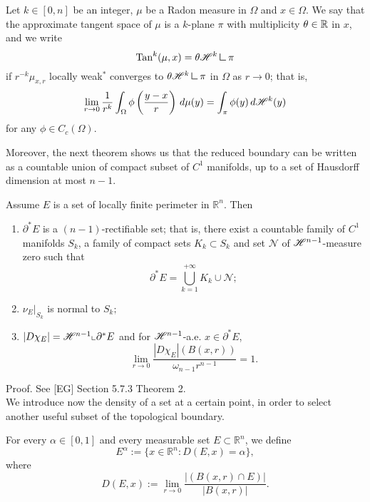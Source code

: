 \begin{definition}
Let $k \in [0, n]$ be an integer, $\mu$ be a Radon measure in $\Omega$ and $x \in \Omega$. We say that the approximate tangent space of $\mu$ is a $k$-plane $\pi$ with multiplicity $\theta \in \mathbb{R}$ in $x$, and we write 
\begin{equation*}
\Tan^{k}(\mu, x) = \theta \Haus{k} \res \pi
\end{equation*}
if $r^{-k} \mu_{x, r}$ locally weak$^*$ converges to $\theta \Haus{k} \res \pi$ in $\Omega$ as $r \to 0$; that is, 
\begin{equation*}
\lim_{r \to 0} \frac{1}{r^{k}} \int_{\Omega} \phi\left (\frac{y - x}{r}\right) \, d \mu(y) = \int_{\pi} \phi(y) \, d \mathscr{H}^{k}(y)
\end{equation*}
for any $\phi \in C_{c}(\Omega)$.
\end{definition}

Moreover, the next theorem shows us that the reduced boundary can be written as a countable union of compact subset of $C^{1}$ manifolds, up to a set of Hausdorff dimension at most $n-1$. 

\begin{theorem} \label{structhm1} Assume $E$ is a set of locally finite perimeter in $\mathbb{R}^{n}$. Then
\begin{enumerate}
	\item $\partial^{*}E$ is a $(n-1)$-rectifiable set; that is, there exist a countable family of $C^{1}$ manifolds $S_{k}$, a family of compact sets $K_{k} \subset S_{k}$ and set $\mathcal{N}$ of $\mathscr{H}^{n-1}$-measure zero such that
\[ \partial^{*}E = \bigcup_{k=1}^{+\infty} K_{k} \cup \mathcal{N}; \]
	\item $\nu_{E} |_{S_{k}}$ is normal to $S_{k};$
	\item $|D\chi_{E}| = \mathscr{H}^{n-1} \llcorner \partial^{*}E$ and for $\mathscr{H}^{n - 1}$-a.e. $x \in \partial^{*}E$,
\[ \lim_{r \to 0 } \frac{|D\chi_{E}|(B(x,r))}{\omega_{n-1}r^{n - 1}} = 1. \]
\end{enumerate}
\end{theorem}
Proof. See [EG] Section 5.7.3 Theorem 2.
\\

We introduce now the density of a set at a certain point, in order to select another useful subset of the topological boundary.

\begin{definition} \label{density} For every $\alpha \in [0, 1]$ and every measurable set $E \subset \mathbb{R}^{n}$, we define
\[ E^{\alpha} := \{ x \in \mathbb{R}^{n} : D(E, x) = \alpha \}, \]
where
\[ D(E, x) := \lim_{r \to 0} \frac{|(B(x,r) \cap E)|}{|B(x,r)|}.  \]
\end{definition}

